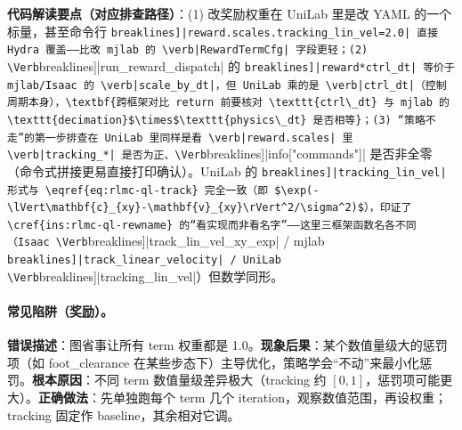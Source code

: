 \textbf{代码解读要点（对应排查路径）}：(1) 改奖励权重在 UniLab 里是改 YAML 的一个标量，甚至命令行 \Verb[breaklines]|reward.scales.tracking_lin_vel=2.0| 直接 Hydra 覆盖——比改 mjlab 的 \verb|RewardTermCfg| 字段更轻；(2) \Verb[breaklines]|run_reward_dispatch| 的 \Verb[breaklines]|reward*ctrl_dt| 等价于 mjlab/Isaac 的 \verb|scale_by_dt|，但 UniLab 乘的是 \verb|ctrl_dt|（控制周期本身），\textbf{跨框架对比 return 前要核对 \texttt{ctrl\_dt} 与 mjlab 的 \texttt{decimation}$\times$\texttt{physics\_dt} 是否相等}；(3) “策略不走”的第一步排查在 UniLab 里同样是看 \verb|reward.scales| 里 \verb|tracking_*| 是否为正、\Verb[breaklines]|info["commands"]| 是否非全零（命令式拼接更易直接打印确认）。UniLab 的 \Verb[breaklines]|tracking_lin_vel| 形式与 \eqref{eq:rlmc-ql-track} 完全一致（即 $\exp(-\lVert\mathbf{c}_{xy}-\mathbf{v}_{xy}\rVert^2/\sigma^2)$），印证了 \cref{ins:rlmc-ql-rewname} 的“看实现而非看名字”——这里三框架函数名各不同（Isaac \Verb[breaklines]|track_lin_vel_xy_exp| / mjlab \Verb[breaklines]|track_linear_velocity| / UniLab \Verb[breaklines]|tracking_lin_vel|）但数学同形。


\paragraph{常见陷阱（奖励）。}

\begin{pitfall}[把所有奖励权重设为 1.0]
\textbf{错误描述}：图省事让所有 term 权重都是 1.0。\textbf{现象后果}：某个数值量级大的惩罚项（如 foot\_clearance 在某些步态下）主导优化，策略学会“不动”来最小化惩罚。\textbf{根本原因}：不同 term 数值量级差异极大（tracking 约 $[0,1]$，惩罚项可能更大）。\textbf{正确做法}：先单独跑每个 term 几个 iteration，观察数值范围，再设权重；tracking 固定作 baseline，其余相对它调。
\end{pitfall}


